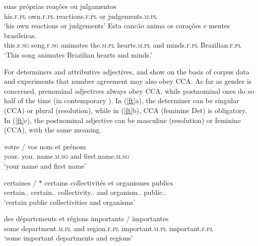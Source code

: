 \eal
\label{fo}
\ex 
\gll suas pr\'{o}prias rea\c{c}\~{o}es ou julgamentos\footnotemark\\
     his.\textsc{f.pl} own.\textsc{f.pl} reactions.\textsc{f.pl} or judgements.\textsc{m.pl} \\
\glt `his own reactions or judgements'
\ex 
\gll Esta canc\~{a}o anima os cora\c{c}\~{o}es e mentes brasileiras.\footnotemark\\
     this.\textsc{f.sg}  song.\textsc{f.sg} animates the.\textsc{m.pl} hearts.\textsc{m.pl} and minds.\textsc{f.pl} Brazilian.\textsc{f.pl} \\
\glt `This song animates Brazilian hearts and minds.'
\zl

For  determiners and attributive adjectives, \citet{An:Abeille:17} and \citet{Abeille:An:Shiraishi:18} show on the basis of corpus data and experiments that number agreement may also obey CCA. As far as gender is concerned, prenominal adjectives always obey CCA, while postnominal ones do so half of the time (in contemporary ). In (\ref{ft}a), the determiner can be singular (CCA) or plural (resolution), while in (\ref{ft}b), CCA (feminine Det) is obligatory. In (\ref{ft}c), the postnominal adjective can be masculine (resolution) or feminine (CCA), with the same meaning.

\eal
\label{ft}
\ex  
\gll votre / vos nom et pr\'{e}nom\footnotemark\\
     your.\SG{} {} you.\PL{} name.\textsc{m.sg} and first.name.\textsc{m.sg} \\
\glt `your name and first name'

\ex 
\gll certaines          / *   certains collectivités et organismes publics\footnotemark\\
     certain.\F.\PL{} {} {} certain.\MAS.\PL{} collectivity.\F.\PL{} and organism.\MAS.\PL{} public.\MAS.\PL{} \\
\glt `certain public collectivities and organisms' 

\ex 
\gll des d\'{e}partements et r\'{e}gions importants / importantes\\
     some department.\textsc{m.pl} and region.\textsc{f.pl} important.\textsc{m.pl} {} important.\textsc{f.pl}\\
\glt `some important departments and regions'
\zl



